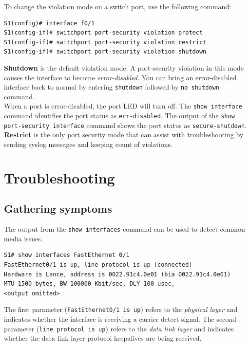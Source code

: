 To change the violation mode on a switch port, use the following command:

\begin{verbatim}
S1(config)# interface f0/1
S1(config-if)# switchport port-security violation protect
S1(config-if)# switchport port-security violation restrict
S1(config-if)# switchport port-security violation shutdown
\end{verbatim}

\textbf{Shutdown} is the default violation mode. A port-security violation in this mode causes the interface to become \emph{error-disabled}. You can bring an error-disabled interface back to normal by entering \verb|shutdown| followed by \verb|no shutdown| command.\\

When a port is error-disabled, the port LED will turn off. The \verb|show interface| command identifies the port status as \verb|err-disabled|. The output of the \verb|show port-security interface| command shows the port status as \verb|secure-shutdown|.\\

\textbf{Restrict} is the only port security mode that can assist with troubleshooting by sending syslog messages and keeping count of violations.

\section{Troubleshooting}

\subsection{Gathering symptoms}

The output from the \verb|show interfaces| command can be used to detect common media issues.

\begin{verbatim}
S1# show interfaces FastEthernet 0/1
FastEthernet0/1 is up, line protocol is up (connected)
Hardware is Lance, address is 0022.91c4.0e01 (bia 0022.91c4.0e01)
MTU 1500 bytes, BW 100000 Kbit/sec, DLY 100 usec,
<output omitted>
\end{verbatim}

The first parameter (\verb|FastEthernet0/1 is up|) refers to the \emph{physical layer} and indicates whether the interface is receiving a carrier detect signal. The second parameter (\verb|line protocol is up|) refers to the \emph{data link layer} and indicates whether the data link layer protocol keepalives are being received.\\

